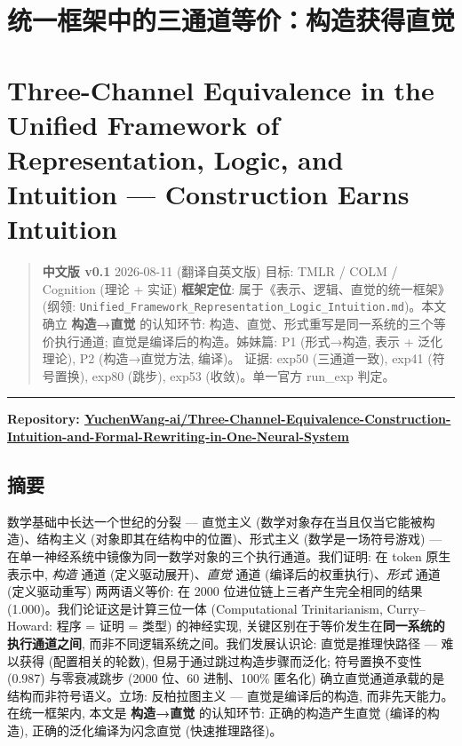 \documentclass[
]{article}
\author{}
\date{}
\begin{document}
\section{统一框架中的三通道等价：构造获得直觉}\label{ux7edfux4e00ux6846ux67b6ux4e2dux7684ux4e09ux901aux9053ux7b49ux4ef7ux6784ux9020ux83b7ux5f97ux76f4ux89c9}

\section{Three-Channel Equivalence in the Unified Framework of
Representation, Logic, and Intuition --- Construction Earns
Intuition}\label{three-channel-equivalence-in-the-unified-framework-of-representation-logic-and-intuition-construction-earns-intuition}

\begin{quote}
\textbf{中文版 v0.1} \textbar{} 2026-08-11 (翻译自英文版) 目标: TMLR /
COLM / Cognition (理论 + 实证) \textbf{框架定位}:
属于《表示、逻辑、直觉的统一框架》(纲领:
\texttt{Unified\_Framework\_Representation\_Logic\_Intuition.md})。本文确立
\textbf{构造→直觉} 的认知环节:
构造、直觉、形式重写是同一系统的三个等价执行通道;
直觉是编译后的构造。姊妹篇: P1 (形式→构造, 表示 + 泛化理论), P2
(构造→直觉方法, 编译)。 证据: exp50 (三通道一致), exp41 (符号置换),
exp80 (跳步), exp53 (收敛)。单一官方 run\_exp 判定。
\end{quote}

\begin{center}\rule{0.5\linewidth}{0.5pt}\end{center}

\textbf{Repository:
\href{https://github.com/YuchenWang-ai/Three-Channel-Equivalence-Construction-Intuition-and-Formal-Rewriting-in-One-Neural-System}{YuchenWang-ai/Three-Channel-Equivalence-Construction-Intuition-and-Formal-Rewriting-in-One-Neural-System}}

\subsection{摘要}\label{ux6458ux8981}

数学基础中长达一个世纪的分裂 --- 直觉主义
(数学对象存在当且仅当它能被构造)、结构主义
(对象即其在结构中的位置)、形式主义 (数学是一场符号游戏) ---
在单一神经系统中镜像为同一数学对象的三个执行通道。我们证明: 在 token
原生表示中, \emph{构造} 通道 (定义驱动展开)、\emph{直觉} 通道
(编译后的权重执行)、\emph{形式} 通道 (定义驱动重写) 两两语义等价: 在
2000 位进位链上三者产生完全相同的结果 (1.000)。我们论证这是计算三位一体
(Computational Trinitarianism, Curry--Howard: 程序 = 证明 = 类型)
的神经实现, 关键区别在于等价发生在\textbf{同一系统的执行通道之间},
而非不同逻辑系统之间。我们发展认识论: 直觉是推理快路径 --- 难以获得
(配置相关的轮数), 但易于通过跳过构造步骤而泛化; 符号置换不变性 (0.987)
与零衰减跳步 (2000 位、60 进制、100\% 匿名化)
确立直觉通道承载的是结构而非符号语义。立场: 反柏拉图主义 ---
直觉是编译后的构造, 而非先天能力。在统一框架内, 本文是
\textbf{构造→直觉} 的认知环节: 正确的构造产生直觉 (编译的构造),
正确的泛化编译为闪念直觉 (快速推理路径)。
\end{document}
